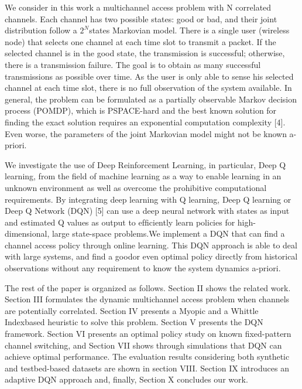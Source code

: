 We consider in this work a multichannel access problem with N correlated channels. Each channel has two possible states: good or bad, and their joint distribution follow a $2^{N}$states Markovian model. There is a single user (wireless node) that selects one channel at each time slot to transmit a packet. If the selected channel is in the good state, the transmission is successful; otherwise, there is a transmission failure. The goal is to obtain as many successful transmissions as possible over time. As the user is only able to sense his selected channel at each time slot, there is no full observation of the system available. In general, the problem can be formulated as a partially observable Markov decision process (POMDP), which is PSPACE-hard and the best known solution for ﬁnding the exact solution requires an exponential computation complexity [4]. Even worse, the parameters of the joint Markovian model might not be known a-priori.

We investigate the use of Deep Reinforcement Learning, in particular, Deep Q learning, from the ﬁeld of machine learning as a way to enable learning in an unknown environment as well as overcome the prohibitive computational requirements. By integrating deep learning with Q learning, Deep Q learning or Deep Q Network (DQN) [5] can use a deep neural network with states as input and estimated Q values as output to efﬁciently learn policies for high-dimensional, large state-space problems.We implement a DQN that can ﬁnd a channel access policy through online learning. This DQN approach is able to deal with large systems, and ﬁnd a goodor even optimal policy directly from historical observations without any requirement to know the system dynamics a-priori. 

The rest of the paper is organized as follows. Section II shows the related work. Section III formulates the dynamic multichannel access problem when channels are potentially correlated. Section IV presents a Myopic and a Whittle Indexbased heuristic to solve this problem. Section V presents the DQN framework. Section VI presents an optimal policy study on known ﬁxed-pattern channel switching, and Section VII shows through simulations that DQN can achieve optimal performance. The evaluation results considering both synthetic and testbed-based datasets are shown in section VIII. Section IX introduces an adaptive DQN approach and, ﬁnally, Section X concludes our work.


